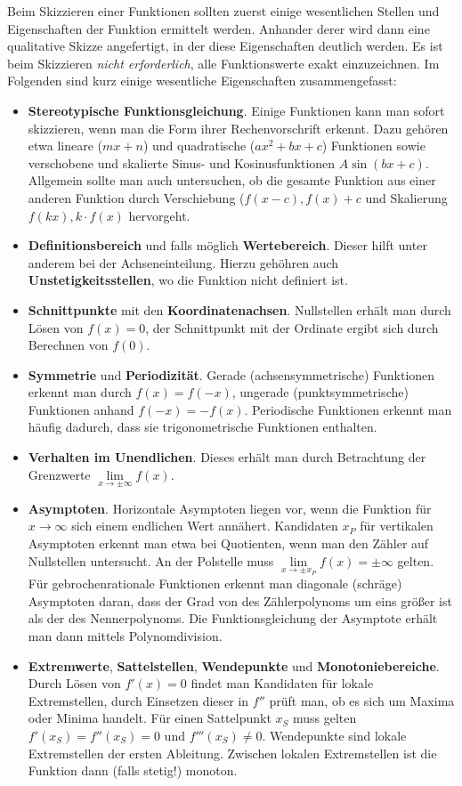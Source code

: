 Beim Skizzieren einer Funktionen sollten zuerst einige wesentlichen Stellen und Eigenschaften der Funktion ermittelt werden. Anhander derer wird dann eine qualitative Skizze angefertigt, in der diese Eigenschaften deutlich werden. Es ist beim Skizzieren \emph{nicht erforderlich}, alle Funktionswerte exakt einzuzeichnen. Im Folgenden sind kurz einige wesentliche Eigenschaften zusammengefasst:

\begin{itemize}
  \item \textbf{Stereotypische Funktionsgleichung}. Einige Funktionen kann man sofort skizzieren, wenn man die Form ihrer Rechenvorschrift erkennt. Dazu gehören etwa lineare ($mx+n$) und quadratische ($ax^2+bx+c$) Funktionen sowie verschobene und skalierte Sinus- und Kosinusfunktionen $A\sin(bx+c)$. Allgemein sollte man auch untersuchen, ob die gesamte Funktion aus einer anderen Funktion durch Verschiebung ($f(x-c), f(x)+c$ und Skalierung $f(kx), k\cdot f(x)$ hervorgeht.
  \item \textbf{Definitionsbereich} und falls möglich \textbf{Wertebereich}. Dieser hilft unter anderem bei der Achseneinteilung. Hierzu gehöhren auch \textbf{Unstetigkeitsstellen}, wo die Funktion nicht definiert ist.
  \item \textbf{Schnittpunkte} mit den \textbf{Koordinatenachsen}. Nullstellen erhält man durch Lösen von $f(x)=0$, der Schnittpunkt mit der Ordinate ergibt sich durch Berechnen von $f(0)$.
  \item \textbf{Symmetrie} und \textbf{Periodizität}. Gerade (achsensymmetrische) Funktionen erkennt man durch $f(x) = f(-x)$, ungerade (punktsymmetrische) Funktionen anhand $f(-x) = -f(x)$. Periodische Funktionen erkennt man häufig dadurch, dass sie trigonometrische Funktionen enthalten.
  \item \textbf{Verhalten im Unendlichen}. Dieses erhält man durch Betrachtung der Grenzwerte $\lim\limits_{x\to\pm\infty} f(x)$.
  \item \textbf{Asymptoten}. Horizontale Asymptoten liegen vor, wenn die Funktion für $x\to\infty$ sich einem endlichen Wert annähert. Kandidaten $x_P$ für vertikalen Asymptoten erkennt man etwa bei Quotienten, wenn man den Zähler auf Nullstellen untersucht. An der Polstelle muss $\lim\limits_{x\to\pm x_P} f(x) = \pm \infty$ gelten. Für gebrochenrationale Funktionen erkennt man diagonale (schräge) Asymptoten daran, dass der Grad von des Zählerpolynoms um eins größer ist als der des Nennerpolynoms. Die Funktionsgleichung der Asymptote erhält man dann mittels Polynomdivision.
  \item \textbf{Extremwerte}, \textbf{Sattelstellen}, \textbf{Wendepunkte} und \textbf{Monotoniebereiche}. Durch Lösen von $f'(x)=0$ findet man Kandidaten für lokale Extremstellen, durch Einsetzen dieser in $f''$ prüft man, ob es sich um Maxima oder Minima handelt. Für einen Sattelpunkt $x_S$ muss gelten $f'(x_S)=f''(x_S)=0$ und $f'''(x_S) \ne 0$. Wendepunkte sind lokale Extremstellen der ersten Ableitung. Zwischen lokalen Extremstellen ist die Funktion dann (falls stetig!) monoton.
\end{itemize}

